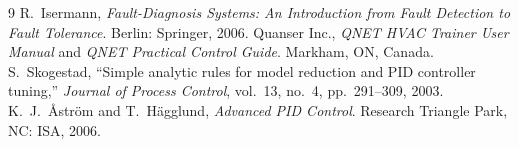 \documentclass[conference,a4paper]{IEEEtran}
\begin{document}
\begin{thebibliography}{9}
 R.~Isermann, \emph{Fault-Diagnosis Systems: An Introduction from Fault
Detection to Fault Tolerance}. Berlin: Springer, 2006.
 Quanser Inc., \emph{QNET HVAC Trainer User Manual} and \emph{QNET Practical
Control Guide}. Markham, ON, Canada.
 S.~Skogestad, ``Simple analytic rules for model reduction and PID controller
tuning,'' \emph{Journal of Process Control}, vol.~13, no.~4, pp.~291--309, 2003.
 K.~J.~{\AA}str{\"o}m and T.~H{\"a}gglund, \emph{Advanced PID Control}.
Research Triangle Park, NC: ISA, 2006.
\end{thebibliography}
\end{document}
